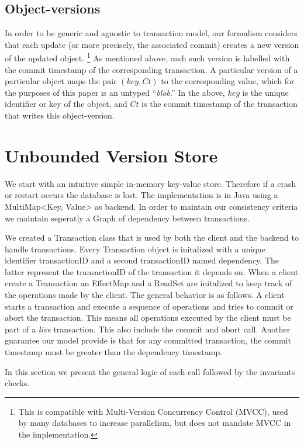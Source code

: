 \documentclass[systeme,french,english]{compas2022}
\begin{document}
\subsection{Object-versions}

In order to be generic and agnostic to transaction model, our formalism
considers that each update (or more precisely, the associated commit)
creates a new version of the updated object.%
%
\footnote{
%
  This is compatible with Multi-Version Concurrency Control (MVCC), used
  by many databases to increase parallelism, but does not mandate MVCC
  in the implementation.
}
%
As mentioned above, each such version is labelled with the commit
timestamp of the corresponding transaction.
A particular version of a particular object maps the pair
$(\mathit{key},\mathit{Ct})$ to the corresponding value, which for the
purposes of this paper is an untyped ``\emph{blob}.''
In the above, $\mathit{key}$ is the unique identifier or key of the
object, and $\mathit{Ct}$ is the commit timestamp of the transaction
that writes this object-version.

\section{Unbounded Version Store}

We start with an intuitive simple in-memory key-value store.
Therefore if a crash or restart occurs the database is lost.
The implementation is in Java using a MultiMap<Key, Value> as backend.
In order to maintain our consistency criteria we maintain seperatly a Graph of dependency between transactions.

We created a Transaction class that is used by both the client and the backend to handle transactions.
Every Transaction object is initalized with a unique identifier transactionID and a second transactionID named dependency.
The latter represent the transactionID of the transaction it depends on.
When a client create a Transaction an EffectMap and a ReadSet are initalized to keep track of the operations made by the client.
The general behavior is as follows.
A client starts a transaction and execute a sequence of operations and tries to commit or abort the transaction.
This means all operations executed by the client must be part of a \emph{live} transaction.
This also include the commit and abort call.
Another guarantee our model provide is that for any committed transaction, the commit timestamp must be greater than the dependency timestamp.

In this section we present the general logic of each call followed by the invariants checks.
\end{document}
